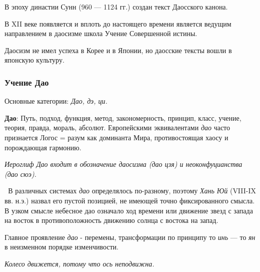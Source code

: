 \documentclass[twoside,a4paper]{article}
\begin{document}
{
В эпоху династии Сунн (960 — 1124 гг.) создан текст {\textquotedbl}Даосского канона{\textquotedbl}.}

{
В \foreignlanguage{english}{XII} веке появляется и вплоть до настоящего времени является ведущим направлением в даосизме
школа {\textquotedbl}Учение Совершенной истины{\textquotedbl}. }

{
Даосизм не имел успеха в Корее и в Японии, но даосские тексты вошли в японскую культуру. }

\subsubsection{Учение Дао}
{
Основные категории: \textit{Дао, дэ, ци.}}

{
\textbf{Дао}: {\textquotedbl}Путь{\textquotedbl}, {\textquotedbl}подход{\textquotedbl},
{\textquotedbl}функция{\textquotedbl}, {\textquotedbl}метод{\textquotedbl},
{\textquotedbl}закономерность{\textquotedbl}, {\textquotedbl}принцип{\textquotedbl},
{\textquotedbl}класс{\textquotedbl}, {\textquotedbl}учение{\textquotedbl}, {\textquotedbl}теория{\textquotedbl},
{\textquotedbl}правда{\textquotedbl}, {\textquotedbl}мораль{\textquotedbl}, {\textquotedbl}абсолют{\textquotedbl}.
Европейскими эквивалентами \textit{дао} часто признается Логос = разум как доминанта Мира, противостоящая хаосу и
порождающая гармонию. }

{\itshape
Иероглиф Дао входит в обозначение даосизма (дао цзя) и неоконфуцианства (дао сюэ). }

{
\textit{\ }В различных системах \textit{дао} определялось по-разному, поэтому \textit{Хань Юй
}(\foreignlanguage{english}{VIII}{}-\foreignlanguage{english}{IX} вв. н.э.) назвал его {\textquotedbl}пустой
позицией{\textquotedbl}, не имеющей точно фиксированного смысла. В узком смысле {\textquotedbl}небесное
дао{\textquotedbl} означало ход времени или движение звезд с запада на восток в противоположность движению солнца с
востока на запад.}

{
Главное проявление \textit{дао} - {\textquotedbl}перемены{\textquotedbl}, трансформации по принципу {\textquotedbl}то
\textit{инь} — то \textit{ян}{\textquotedbl} в неизменном порядке изменчивости.}

{\itshape
Колесо движется, потому что ось неподвижна.}
\end{document}
